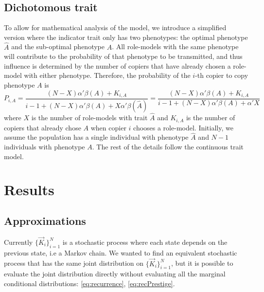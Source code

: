 \documentclass[11pt]{article}
\begin{document}
\subsection{Dichotomous trait}
To allow for mathematical analysis of the model, we introduce a simplified version where the indicator trait only has two phenotypes: the optimal phenotype $\hat{A}$ and the sub-optimal phenotype $A$. 
All role-models with the same phenotype will contribute to the probability of that phenotype to be transmitted, and thus influence is determined by the number of copiers that have already chosen a role-model with either phenotype.
Therefore, the probability of the $i$-th copier to copy phenotype $A$ is
\begin{equation}\label{eq:binary-model}
P_{i,A} = \frac{(N-X)\alpha'\beta(A) + K_{i,A}}{i-1 + (N-X)\alpha'\beta(A) + X\alpha'\beta(\hat{A})} = \frac{(N-X)\alpha'\beta(A) + K_{i,A}}{i-1 + (N-X)\alpha'\beta(A) + \alpha'X} %
\end{equation}
where $X$ is the number of role-models with trait $\hat{A}$ and $K_{i,A}$ is the number of copiers that already chose $A$ when copier $i$ chooses a role-model.
Initially, we assume the population has a single individual with phenotype $\hat{A}$ and $N-1$ individuals with phenotype $A$. The rest of the details follow the continuous trait model.

\section{Results}
\subsection{Approximations}
Currently $\big\{\vec{K}_i\big\}_{i=1}^N$ is a stochastic process where each state depends on the previous state, i.e a Markov chain.
We wanted to find an equivalent stochastic process that has the same joint distribution on $\big\{\vec{K}_i\big\}_{i=1}^N$, but it is possible to evaluate the joint distribution directly without evaluating all the marginal conditional distributions: \cref{eq:recurrence}, \cref{eq:recPrestige}.
\end{document}
